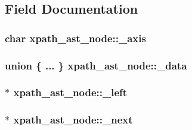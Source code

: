 \label{classxpath__ast__node_aa141bfbd4d5e42da83f0de8f729eb849}


\subsection{Field Documentation}
\hypertarget{classxpath__ast__node_a97b21db6df156c37ef7f2e6f69478b77}{
\subsubsection[{\_\-axis}]{\setlength{\rightskip}{0pt plus 5cm}char {\bf xpath\_\-ast\_\-node::\_\-axis}}}
\label{classxpath__ast__node_a97b21db6df156c37ef7f2e6f69478b77}
\hypertarget{classxpath__ast__node_a4d08bfca00b137fc5b94314edeed2501}{
\subsubsection[{\_\-data}]{\setlength{\rightskip}{0pt plus 5cm}union \{ ... \}   {\bf xpath\_\-ast\_\-node::\_\-data}}}
\label{classxpath__ast__node_a4d08bfca00b137fc5b94314edeed2501}
\hypertarget{classxpath__ast__node_ad229146ced94be21eb5e4921b43a7ebb}{
\subsubsection[{\_\-left}]{$\ast$ {\bf xpath\_\-ast\_\-node::\_\-left}}}
\label{classxpath__ast__node_ad229146ced94be21eb5e4921b43a7ebb}
\hypertarget{classxpath__ast__node_a10059a66ecff3384e175e00d9fa2afcd}{
\subsubsection[{\_\-next}]{$\ast$ {\bf xpath\_\-ast\_\-node::\_\-next}}}
